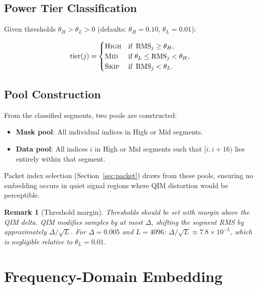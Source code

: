 \documentclass[11pt,a4paper]{article}
\newtheorem{remark}[theorem]{Remark}
\DeclareMathOperator{\rms}{RMS}
\begin{document}
\subsection{Power Tier Classification}

Given thresholds $\theta_H > \theta_L > 0$ (defaults: $\theta_H = 0.10$,
$\theta_L = 0.01$):

\[
    \text{tier}(j) = \begin{cases}
        \textsc{High} & \text{if } \rms_j \geq \theta_H, \\
        \textsc{Mid}  & \text{if } \theta_L \leq \rms_j < \theta_H, \\
        \textsc{Skip} & \text{if } \rms_j < \theta_L.
    \end{cases}
\]

\subsection{Pool Construction}

From the classified segments, two pools are constructed:
\begin{itemize}
    \item \textbf{Mask pool}: All individual indices in High or Mid segments.
    \item \textbf{Data pool}: All indices $i$ in High or Mid segments
          such that $[i, i+16)$ lies entirely within that segment.
\end{itemize}

Packet index selection (Section~\ref{sec:packet}) draws from these pools,
ensuring no embedding occurs in quiet signal regions where QIM distortion
would be perceptible.

\begin{remark}[Threshold margin]
Thresholds should be set with margin above the QIM delta.  QIM modifies
samples by at most $\Delta$, shifting the segment RMS by approximately
$\Delta / \sqrt{L}$.  For $\Delta = 0.005$ and $L = 4096$:
$\Delta / \sqrt{L} \approx 7.8 \times 10^{-5}$,
which is negligible relative to $\theta_L = 0.01$.
\end{remark}


\section{Frequency-Domain Embedding}
\label{sec:freq}
\end{document}
